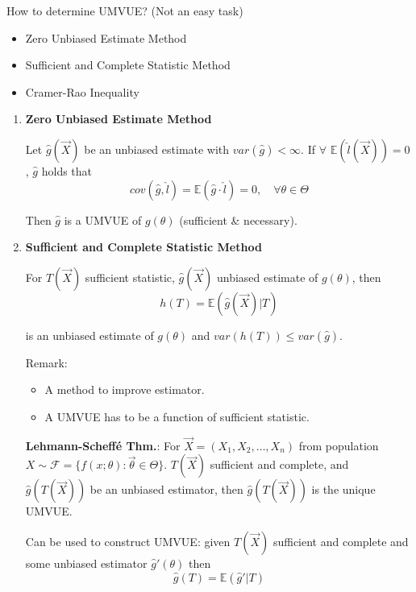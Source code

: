         How to determine UMVUE? (Not an easy task)
        \begin{itemize}
            \item Zero Unbiased Estimate Method
            \item Sufficient and Complete Statistic Method
            \item Cramer-Rao Inequality
        \end{itemize}

\begin{enumerate}
\item \textbf{Zero Unbiased Estimate Method}
            
    Let $\hat{g}(\vec{X})$ be an unbiased estimate with $var(\hat{g})<\infty$. If $\forall$ $\mathbb{E}(\hat{l}(\vec{X}))=0$ , $\hat{g}$ holds that
    \begin{equation}
        cov(\hat{g},\hat{l})=\mathbb{E}(\hat{g}\cdot\hat{l})=0,\quad\forall\theta\in\Theta    
    \end{equation}

    Then $\hat{g}$ is a UMVUE of $g(\theta)$ (sufficient \& necessary).





\item \textbf{Sufficient and Complete Statistic Method}

    For $T(\vec{X})$ sufficient statistic, $\hat{g}(\vec{X})$ unbiased estimate of $g(\theta)$, then 
\begin{equation}
    h(T)=\mathbb{E}(\hat{g}(\vec{X})| T)    
\end{equation}

    is an unbiased estimate of $g(\theta)$ and $var(h(T))\leq var(\hat{g})$.

    Remark:
    \begin{itemize}
        \item A method to improve estimator.
        \item A UMVUE has to be a function of sufficient statistic.
    \end{itemize}

    \textbf{Lehmann-Scheffé Thm.}: For $\vec{X}=(X_1,X_2,\ldots,X_n)$ from population $X\sim\mathscr{F}=\{f(x;\theta):\vec{\theta}\in\Theta\}$. $T(\vec{X})$ sufficient and complete, and $\hat{g}(T(\vec{X}))$ be an unbiased estimator, then $\hat{g}(T(\vec{X}))$ is the unique UMVUE.

    Can be used to construct UMVUE: given $T(\vec{X})$ sufficient and complete and some unbiased estimator $\hat{g}\prime(\theta)$ then 
    \begin{equation}
        \hat{g}(T)=\mathbb{E}(\hat{g}\prime|T)    
    \end{equation}


\end{enumerate}
